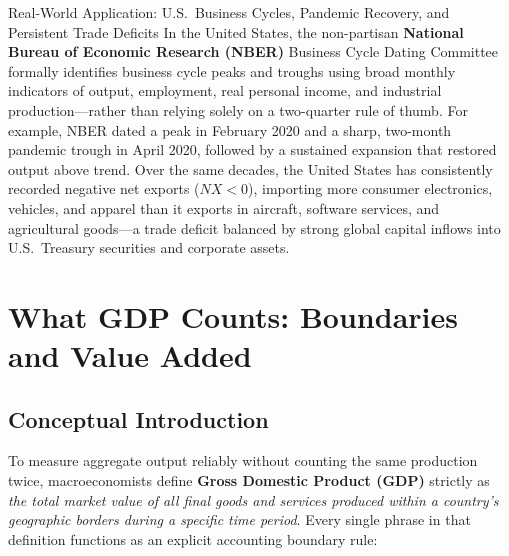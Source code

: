 \documentclass[11pt,letterpaper]{article}
\begin{document}
\begin{examplecase}{Real-World Application: U.S.\ Business Cycles, Pandemic Recovery, and Persistent Trade Deficits}
In the United States, the non-partisan \textbf{National Bureau of Economic Research (NBER)} Business Cycle Dating Committee formally identifies business cycle peaks and troughs using broad monthly indicators of output, employment, real personal income, and industrial production—rather than relying solely on a two-quarter rule of thumb. For example, NBER dated a peak in February 2020 and a sharp, two-month pandemic trough in April 2020, followed by a sustained expansion that restored output above trend. Over the same decades, the United States has consistently recorded negative net exports ($NX < 0$), importing more consumer electronics, vehicles, and apparel than it exports in aircraft, software services, and agricultural goods—a trade deficit balanced by strong global capital inflows into U.S.\ Treasury securities and corporate assets.
\end{examplecase}

\section{What GDP Counts: Boundaries and Value Added}

\subsection*{Conceptual Introduction}
To measure aggregate output reliably without counting the same production twice, macroeconomists define \textbf{Gross Domestic Product (GDP)} strictly as \emph{the total market value of all final goods and services produced within a country's geographic borders during a specific time period}. Every single phrase in that definition functions as an explicit accounting boundary rule:
\end{document}
